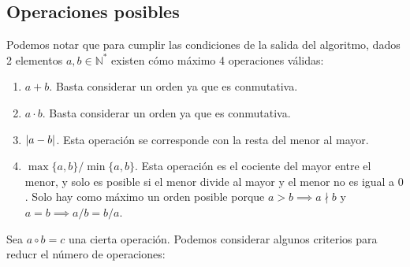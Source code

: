 \subsection{Operaciones posibles}

Podemos notar que para cumplir las condiciones de la salida del algoritmo,
dados 2 elementos $a,b \in \mathbb{N}^{\ast}$ existen cómo máximo 4 operaciones válidas:

\begin{enumerate}
	\item $a+b$. Basta considerar un orden ya que es conmutativa.
	\item $a\cdot b$. Basta considerar un orden ya que es conmutativa.
	\item $|a-b|$. Esta operación se corresponde con la resta del menor al mayor.
	\item $\max\{a,b\}/\min\{a,b\}$. Esta operación es el cociente del mayor entre el menor, y solo es posible si el menor divide al mayor y el menor no es igual a $0$. Solo hay como máximo un orden posible porque $a > b \implies a \nmid b$ y $a = b \implies a/b = b/a$.
\end{enumerate}

Sea $a \circ b = c$ una cierta operación.
Podemos considerar algunos criterios para reducr el número de operaciones:

